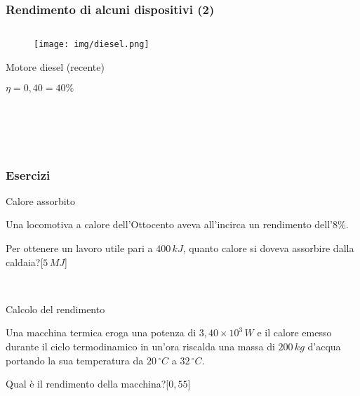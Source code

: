 \documentclass[]{beamer}
\theoremstyle{plain}
\begin{document}
\begin{frame}
  \frametitle{Rendimento di alcuni dispositivi (2)}
  \begin{columns}
    \begin{column}{0.3\textwidth}
      \begin{figure}
        \texttt{[image: img/diesel.png]}
      \end{figure}
      Motore diesel (recente)
      
      $ \eta = 0,40 = 40 \% $
    \end{column}
    \begin{column}{0.3\textwidth}
    \end{column}
    \begin{column}{0.3\textwidth}
    \end{column}
  \end{columns}

  ~

  ~

\end{frame}

\begin{frame}
  \frametitle{Esercizi}
  \begin{exampleblock}{Calore assorbito}
    \small{
    Una locomotiva a calore dell'Ottocento aveva all'incirca un rendimento dell'$ 8\% $.
  
    Per ottenere un lavoro utile pari a $ 400 \, kJ $, quanto calore si doveva assorbire dalla caldaia?\hspace*{\fill}[$ 5 \, MJ $]}
  \end{exampleblock}
  
  ~
  
  \begin{exampleblock}{Calcolo del rendimento}
    \small{
    Una macchina termica eroga una potenza di $ 3,40 \times 10^{3} \, W $ e il calore emesso durante il ciclo termodinamico in un'ora riscalda una massa di $ 200 \, kg $ d'acqua portando la sua temperatura da $ 20 \, ^\circ C $ a $ 32 \, ^\circ C $.
  
    Qual è il rendimento della macchina?\hspace*{\fill}[$ 0,55 $]}
  \end{exampleblock}
  \end{frame}
\end{document}
